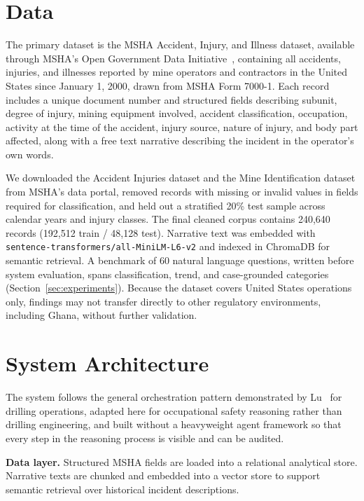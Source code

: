 \documentclass[11pt,a4paper]{article}
\begin{document}
\section{Data}
\label{sec:data}

The primary dataset is the MSHA Accident, Injury, and Illness dataset,
available through MSHA's Open Government Data Initiative~\cite{MSHA2024},
containing all accidents, injuries, and illnesses reported by mine operators
and contractors in the United States since January 1, 2000, drawn from MSHA
Form 7000-1. Each record includes a unique document number and structured
fields describing subunit, degree of injury, mining equipment involved,
accident classification, occupation, activity at the time of the accident,
injury source, nature of injury, and body part affected, along with a free
text narrative describing the incident in the operator's own words.

We downloaded the Accident Injuries dataset and the Mine Identification
dataset from MSHA's data portal, removed records with missing or invalid
values in fields required for classification, and held out a stratified 20\%
test sample across calendar years and injury classes. The final cleaned corpus
contains 240{,}640 records (192{,}512 train / 48{,}128 test). Narrative text
was embedded with \texttt{sentence-transformers/all-MiniLM-L6-v2} and indexed
in ChromaDB for semantic retrieval. A benchmark of 60 natural language
questions, written before system evaluation, spans classification, trend, and
case-grounded categories (Section~\ref{sec:experiments}). Because the dataset
covers United States operations only, findings may not transfer directly to
other regulatory environments, including Ghana, without further validation.

\section{System Architecture}
\label{sec:architecture}

The system follows the general orchestration pattern demonstrated by Lu~\cite{Lu2026}
for drilling operations, adapted here for occupational safety reasoning rather
than drilling engineering, and built without a heavyweight agent framework so
that every step in the reasoning process is visible and can be audited.

\textbf{Data layer.} Structured MSHA fields are loaded into a relational
analytical store. Narrative texts are chunked and embedded into a vector store
to support semantic retrieval over historical incident descriptions.
\end{document}
